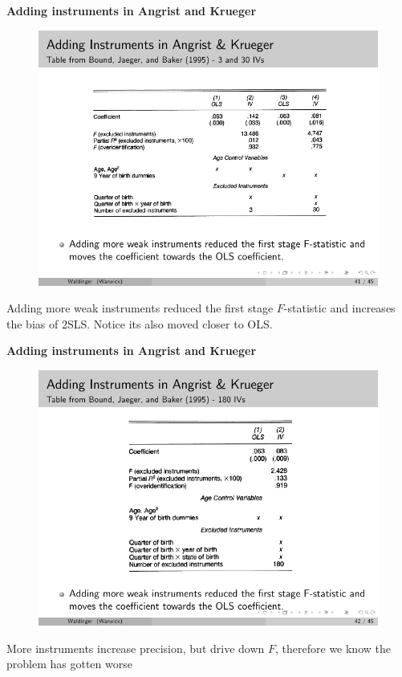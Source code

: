 \documentclass[notes=show]{beamer}
\begin{document}
\begin{frame}[plain]

	\begin{center}
	\textbf{Adding instruments in Angrist and Krueger}
	\end{center}
	
	\begin{figure}
	\includegraphics{./lecture_includes/ak_iv1.pdf}
	\end{figure}
	
Adding more weak instruments reduced the first stage $F$-statistic and increases the bias of 2SLS. Notice its also moved closer to OLS. 
	
\end{frame}

\begin{frame}[plain]

	\begin{center}
	\textbf{Adding instruments in Angrist and Krueger}
	\end{center}
	
	\begin{figure}
	\includegraphics{./lecture_includes/ak_iv2.pdf}
	\end{figure}
	
More instruments increase precision, but drive down $F$, therefore we know the problem has gotten worse
	
\end{frame}
\end{document}
